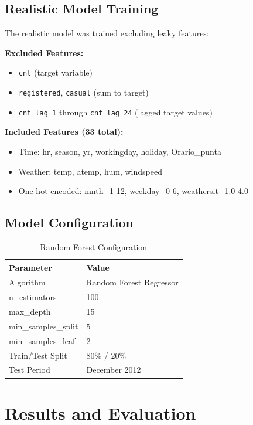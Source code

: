 \documentclass[12pt,a4paper]{article}
\begin{document}
\subsection{Realistic Model Training}

The realistic model was trained excluding leaky features:

\textbf{Excluded Features:}
\begin{itemize}
    \item \texttt{cnt} (target variable)
    \item \texttt{registered}, \texttt{casual} (sum to target)
    \item \texttt{cnt\_lag\_1} through \texttt{cnt\_lag\_24} (lagged target values)
\end{itemize}

\textbf{Included Features (33 total):}
\begin{itemize}
    \item Time: hr, season, yr, workingday, holiday, Orario\_punta
    \item Weather: temp, atemp, hum, windspeed
    \item One-hot encoded: mnth\_1-12, weekday\_0-6, weathersit\_1.0-4.0
\end{itemize}

\subsection{Model Configuration}

\begin{table}[H]
\centering
\caption{Random Forest Configuration}
\begin{tabular}{ll}
\toprule
\textbf{Parameter} & \textbf{Value} \\
\midrule
Algorithm & Random Forest Regressor \\
n\_estimators & 100 \\
max\_depth & 15 \\
min\_samples\_split & 5 \\
min\_samples\_leaf & 2 \\
Train/Test Split & 80\% / 20\% \\
Test Period & December 2012 \\
\bottomrule
\end{tabular}
\label{tab:config}
\end{table}

\section{Results and Evaluation}
\end{document}
